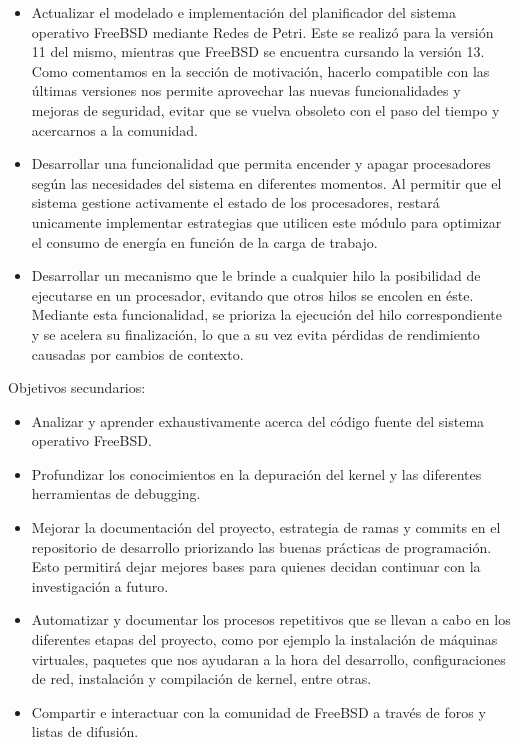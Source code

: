 \begin{itemize}
    \item Actualizar el modelado e implementación del planificador del sistema operativo FreeBSD mediante Redes de Petri. Este se realizó para la versión 11 del mismo, mientras que FreeBSD se encuentra cursando la versión 13. Como comentamos en la sección de motivación, hacerlo compatible con las últimas versiones nos permite aprovechar las nuevas funcionalidades y mejoras de seguridad, evitar que se vuelva obsoleto con el paso del tiempo y acercarnos a la comunidad.
    \item Desarrollar una funcionalidad que permita encender y apagar procesadores según las necesidades del sistema en diferentes momentos. Al permitir que el sistema gestione activamente el estado de los procesadores, restará unicamente implementar estrategias que utilicen este módulo para optimizar el consumo de energía en función de la carga de trabajo.
    \item Desarrollar un mecanismo que le brinde a cualquier hilo la posibilidad de ejecutarse en un procesador, evitando que otros hilos se encolen en éste. Mediante esta funcionalidad, se prioriza la ejecución del hilo correspondiente y se acelera su finalización, lo que a su vez evita pérdidas de rendimiento causadas por cambios de contexto.
\end{itemize}

Objetivos secundarios:

\begin{itemize}
    \item Analizar y aprender exhaustivamente acerca del código fuente del sistema operativo FreeBSD.\@
    \item Profundizar los conocimientos en la depuración del kernel y las diferentes herramientas de debugging.
    \item Mejorar la documentación del proyecto, estrategia de ramas y commits en el repositorio de desarrollo priorizando las buenas prácticas de programación. Esto permitirá dejar mejores bases para quienes decidan continuar con la investigación a futuro.
    \item Automatizar y documentar los procesos repetitivos que se llevan a cabo en los diferentes etapas del proyecto, como por ejemplo la instalación de máquinas virtuales, paquetes que nos ayudaran a la hora del desarrollo, configuraciones de red, instalación y compilación de kernel, entre otras.
    \item Compartir e interactuar con la comunidad de FreeBSD a través de foros y listas de difusión.
\end{itemize}


